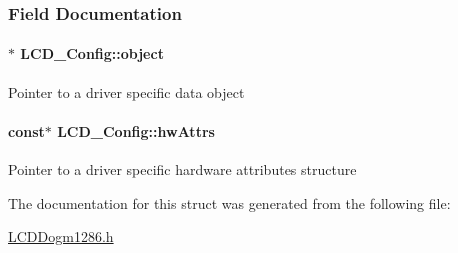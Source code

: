 \subsubsection{Field Documentation}
\paragraph[{object}]{$\ast$ L\+C\+D\+\_\+\+Config\+::object}\label{struct_l_c_d___config_a264b39a3788c4e64089320afa5ad33fc}
Pointer to a driver specific data object 
\paragraph[{hw\+Attrs}]{ const$\ast$ L\+C\+D\+\_\+\+Config\+::hw\+Attrs}\label{struct_l_c_d___config_a76942612562659fe3b3254b24c66f2b9}
Pointer to a driver specific hardware attributes structure 

The documentation for this struct was generated from the following file\+:\begin{DoxyCompactItemize}
\item 
\hyperlink{_l_c_d_dogm1286_8h}{L\+C\+D\+Dogm1286.\+h}\end{DoxyCompactItemize}
